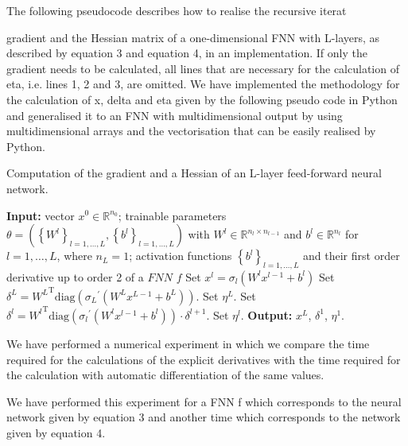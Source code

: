 The following pseudocode describes how to realise the recursive iterat

gradient and the Hessian matrix of a one-dimensional FNN with L-layers, as described by equation 3 and equation 4, in an implementation. If only the gradient needs to be calculated, all lines that are necessary for the calculation of eta, i.e. lines 1, 2 and 3, are omitted. We have implemented the methodology for the calculation of x, delta and eta given by the following pseudo code in Python and generalised it to an FNN with multidimensional output by using multidimensional arrays and the vectorisation that can be easily realised by Python. 

\begin{algorithm}[H]
    \caption{Computation of the gradient and a Hessian of an L-layer feed-forward neural network.}
    \begin{algorithmic}[1]
        \State \textbf{Input:} vector $x^0 \in \mathbb{R}^{n_0}$; trainable parameters $\theta = \left(\left\{ W^l \right\}_{l = 1, \ldots, L}, \left\{ b^l \right\}_{l = 1, \ldots, L}\right)$ with $W^l \in \mathbb{R}^{n_l \times n_{l-1}}$ and $b^l \in \mathbb{R}^{n_l}$ for $l = 1, \ldots, L$, where $n_L = 1$; activation functions $\left\{ b^l \right\}_{l = 1, \ldots, L}$ and their first order derivative up to order 2 of a $FNN$ $f$
            \State Set $x^l = \sigma_l\left(W^l x^{l-1} + b^l\right)$
        \EndFor
        \State Set $\delta^{L} = {W^{L}}^{\mathrm{T}} \mathrm{diag}\left({\sigma_{L}}^{\prime}\left(W^{L} x^{L-1} + b^{L}\right)\right)$.
        \State Set $\eta^{L}$.
            \State Set $\delta^{l} = {W^{l}}^{\mathrm{T}} \mathrm{diag}\left({\sigma_{l}}^{\prime}\left(W^{l} x^{l-1} + b^{l}\right)\right) \cdot \delta^{l+1}$.
            \State Set $\eta^{l}$.
        \EndFor
        \State \textbf{Output:} $x^L$, $\delta^1$, $\eta^1$.
    \end{algorithmic}
\end{algorithm}
We have performed a numerical experiment in which we compare the time required for the calculations of the explicit derivatives with the time required for the calculation with automatic differentiation of the same values. 

We have performed this experiment for a FNN f which corresponds to the neural network given by equation 3 and another time which corresponds to the network given by equation 4. 

